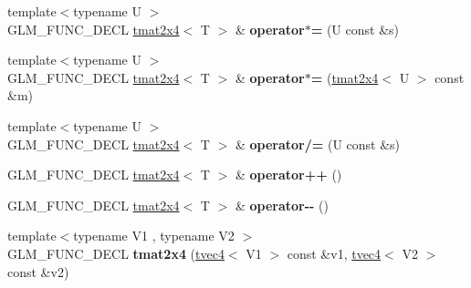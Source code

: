 \begin{DoxyCompactItemize}
\item 
\hypertarget{structglm_1_1detail_1_1tmat2x4_a234a9403b141b14a9a1f16ba2e318bd7}{{\footnotesize template$<$typename U $>$ }\\\-G\-L\-M\-\_\-\-F\-U\-N\-C\-\_\-\-D\-E\-C\-L \hyperlink{structglm_1_1detail_1_1tmat2x4}{tmat2x4}$<$ \-T $>$ \& {\bfseries operator$\ast$=} (\-U const \&s)}\label{structglm_1_1detail_1_1tmat2x4_a234a9403b141b14a9a1f16ba2e318bd7}

\item 
\hypertarget{structglm_1_1detail_1_1tmat2x4_a1a915d5fccc68ff86838db47220f3510}{{\footnotesize template$<$typename U $>$ }\\\-G\-L\-M\-\_\-\-F\-U\-N\-C\-\_\-\-D\-E\-C\-L \hyperlink{structglm_1_1detail_1_1tmat2x4}{tmat2x4}$<$ \-T $>$ \& {\bfseries operator$\ast$=} (\hyperlink{structglm_1_1detail_1_1tmat2x4}{tmat2x4}$<$ \-U $>$ const \&m)}\label{structglm_1_1detail_1_1tmat2x4_a1a915d5fccc68ff86838db47220f3510}

\item 
\hypertarget{structglm_1_1detail_1_1tmat2x4_acdb99c7502c3ed4d3f86e97f6b0810a2}{{\footnotesize template$<$typename U $>$ }\\\-G\-L\-M\-\_\-\-F\-U\-N\-C\-\_\-\-D\-E\-C\-L \hyperlink{structglm_1_1detail_1_1tmat2x4}{tmat2x4}$<$ \-T $>$ \& {\bfseries operator/=} (\-U const \&s)}\label{structglm_1_1detail_1_1tmat2x4_acdb99c7502c3ed4d3f86e97f6b0810a2}

\item 
\hypertarget{structglm_1_1detail_1_1tmat2x4_aad6b04f50e7c4a7e4f3ccb22c0a4045d}{\-G\-L\-M\-\_\-\-F\-U\-N\-C\-\_\-\-D\-E\-C\-L \hyperlink{structglm_1_1detail_1_1tmat2x4}{tmat2x4}$<$ \-T $>$ \& {\bfseries operator++} ()}\label{structglm_1_1detail_1_1tmat2x4_aad6b04f50e7c4a7e4f3ccb22c0a4045d}

\item 
\hypertarget{structglm_1_1detail_1_1tmat2x4_a39cc3e39c18aab49e20b7188606bc261}{\-G\-L\-M\-\_\-\-F\-U\-N\-C\-\_\-\-D\-E\-C\-L \hyperlink{structglm_1_1detail_1_1tmat2x4}{tmat2x4}$<$ \-T $>$ \& {\bfseries operator-\/-\/} ()}\label{structglm_1_1detail_1_1tmat2x4_a39cc3e39c18aab49e20b7188606bc261}

\item 
\hypertarget{structglm_1_1detail_1_1tmat2x4_a10742f23a5740f8aba4b4b1f5c547afd}{{\footnotesize template$<$typename V1 , typename V2 $>$ }\\\-G\-L\-M\-\_\-\-F\-U\-N\-C\-\_\-\-D\-E\-C\-L {\bfseries tmat2x4} (\hyperlink{structglm_1_1detail_1_1tvec4}{tvec4}$<$ \-V1 $>$ const \&v1, \hyperlink{structglm_1_1detail_1_1tvec4}{tvec4}$<$ \-V2 $>$ const \&v2)}\label{structglm_1_1detail_1_1tmat2x4_a10742f23a5740f8aba4b4b1f5c547afd}

\end{DoxyCompactItemize}
